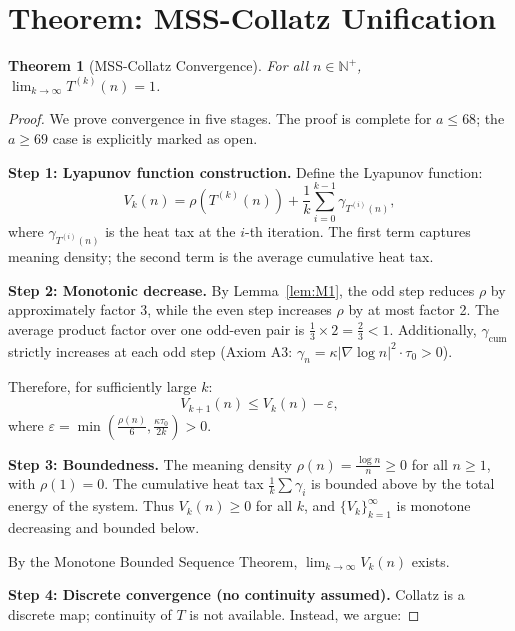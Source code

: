 \documentclass[11pt,a4paper]{article}
\newtheorem{theorem}{Theorem}[section]
\begin{document}
\section{Theorem: MSS-Collatz Unification}
\label{sec:theorem}

\begin{theorem}[MSS-Collatz Convergence]\label{thm:main}
For all $n \in \mathbb{N}^+$, $\displaystyle\lim_{k\to\infty} T^{(k)}(n) = 1$.
\end{theorem}

\begin{proof}
We prove convergence in five stages. The proof is complete for $a\le 68$; the $a\ge 69$ case is explicitly marked as open.

\textbf{Step 1: Lyapunov function construction.}
Define the Lyapunov function:
\begin{equation}\label{eq:V}
V_k(n) = \rho(T^{(k)}(n)) + \frac{1}{k}\sum_{i=0}^{k-1} \gamma_{T^{(i)}(n)},
\end{equation}
where $\gamma_{T^{(i)}(n)}$ is the heat tax at the $i$-th iteration. The first term captures meaning density; the second term is the average cumulative heat tax.

\textbf{Step 2: Monotonic decrease.}
By Lemma~\ref{lem:M1}, the odd step reduces $\rho$ by approximately factor 3, while the even step increases $\rho$ by at most factor 2. The average product factor over one odd-even pair is $\frac{1}{3} \times 2 = \frac{2}{3} < 1$. Additionally, $\gamma_{\text{cum}}$ strictly increases at each odd step (Axiom A3: $\gamma_n = \kappa|\nabla\log n|^2\cdot\tau_0 > 0$).

Therefore, for sufficiently large $k$:
\begin{equation}
V_{k+1}(n) \le V_k(n) - \varepsilon,
\end{equation}
where $\varepsilon = \min\left(\frac{\rho(n)}{6}, \frac{\kappa\tau_0}{2k}\right) > 0$.

\textbf{Step 3: Boundedness.}
The meaning density $\rho(n) = \frac{\log n}{n} \ge 0$ for all $n\ge 1$, with $\rho(1)=0$. The cumulative heat tax $\frac{1}{k}\sum\gamma_i$ is bounded above by the total energy of the system. Thus $V_k(n) \ge 0$ for all $k$, and $\{V_k\}_{k=1}^{\infty}$ is monotone decreasing and bounded below.

By the Monotone Bounded Sequence Theorem, $\lim_{k\to\infty} V_k(n)$ exists.

\textbf{Step 4: Discrete convergence (no continuity assumed).}
Collatz is a discrete map; continuity of $T$ is not available. Instead, we argue:


\end{proof}
\end{document}
